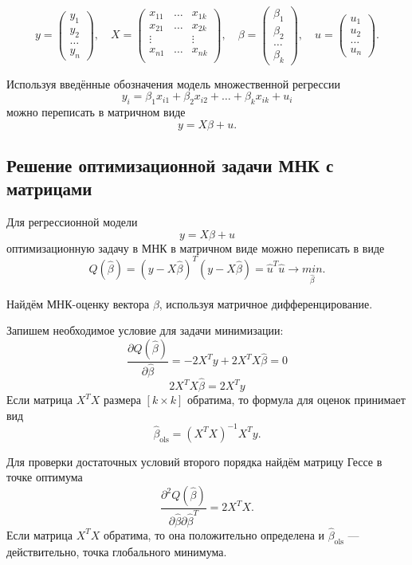 \documentclass[12pt]{article}
\newcommand{\hb}{\hat{\beta}}
\newcommand{\hu}{\hat{u}}
\newcommand{\ols}{\text{ols}}
\begin{document}
\[
y =  \begin{pmatrix}
y_1 \\
y_2 \\
\dots \\
y_n
 \end{pmatrix},\quad
X = \begin{pmatrix}
    x_{11} & \dots & x_{1k} \\
    x_{21} & \dots & x_{2k} \\
    \vdots &   & \vdots \\
    x_{n1} & \dots & x_{nk} \\
\end{pmatrix}, \quad
\beta = \begin{pmatrix}
    \beta_1\\
    \beta_2\\
    \dots \\
    \beta_k
\end{pmatrix}, \quad
u =  \begin{pmatrix}
u_1 \\
u_2 \\
\dots \\
u_n
 \end{pmatrix}.
\]

Используя введённые обозначения модель множественной регрессии
\[
y_i = \beta_1 x_{i1} + \beta_2 x_{i2} + \dots + \beta_k x_{ik} + u_i
\]
можно переписать в матричном виде
\[
y = X\beta + u.
\]

\subsection{Решение оптимизационной задачи МНК с матрицами}
Для регрессионной модели
\[
y = X\beta + u
\]
оптимизационную задачу в МНК в матричном виде можно переписать в виде
\[
Q(\hb) = (y-X\hb)^T(y-X\hb) = \hu^T\hu \to \underset{\hb}{min}.
\]

Найдём МНК-оценку вектора $\beta$, используя матричное дифференцирование.

Запишем необходимое условие для задачи минимизации: 
\[
\frac{\partial Q(\hb)}{\partial \hb} = -2X^{T}y + 2X^TX\hb = 0
\]
\[
2X^TX\hb = 2X^{T}y
\]
Если матрица $X^TX$ размера $[k\times k]$ обратима, то формула для оценок принимает вид
\[
\hb_{\ols} = (X^TX)^{-1}X^Ty.
\]

Для проверки достаточных условий второго порядка найдём матрицу Гессе в точке оптимума
\[
\frac{\partial^2 Q(\hb)}{\partial \hb \partial \hb^T} = 2X^TX.
\]
Если матрица $X^TX$ обратима, то она положительно определена и $\hb_{\ols}$ — действительно, точка глобального минимума. 
\end{document}

